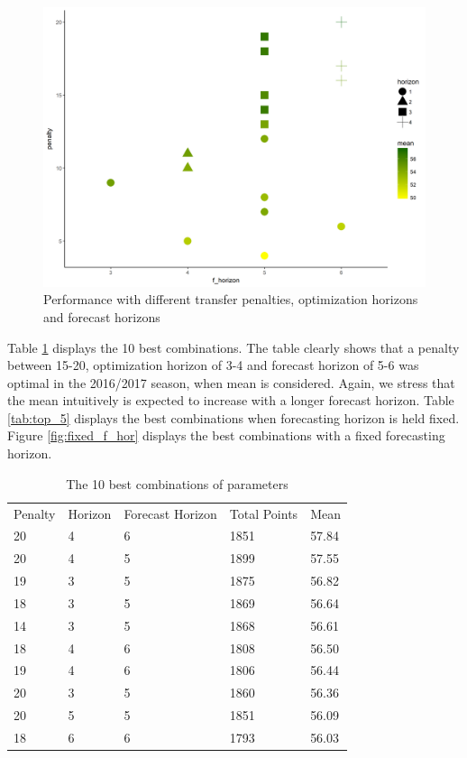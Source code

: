 \begin{figure}[H]
    \centering
    \includegraphics[scale=0.45]{fig/chapter_6/paramter_choice.png}
    \caption{Performance with different transfer penalties, optimization horizons and forecast horizons}
\label{Parameter_choice}    
\end{figure}

Table \ref{tab:top_10} displays the 10 best combinations. The table clearly shows that a penalty between 15-20, optimization horizon of 3-4 and forecast horizon of 5-6 was optimal in the 2016/2017 season, when mean is considered. Again, we stress that the mean intuitively is expected to increase with a longer forecast horizon. Table \ref{tab:top_5} displays the best combinations when forecasting horizon is held fixed. Figure \ref{fig:fixed_f_hor} displays the best combinations with a fixed forecasting horizon.



\begin{table}[H]
\centering
\caption{The 10 best combinations of parameters}
\label{tab:top_10}
\begin{tabular}{lllll}
Penalty & Horizon & Forecast Horizon & Total Points & Mean  \\
20      & 4       & 6                & 1851         & 57.84 \\
20      & 4       & 5                & 1899         & 57.55 \\
19      & 3       & 5                & 1875         & 56.82 \\
18      & 3       & 5                & 1869         & 56.64 \\
14      & 3       & 5                & 1868         & 56.61 \\
18      & 4       & 6                & 1808         & 56.50 \\
19      & 4       & 6                & 1806         & 56.44 \\
20      & 3       & 5                & 1860         & 56.36 \\
20      & 5       & 5                & 1851         & 56.09 \\
18      & 6       & 6                & 1793         & 56.03
\end{tabular}
\end{table}

